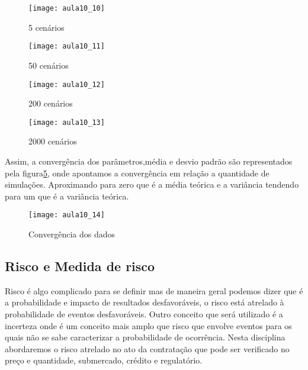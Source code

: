 \begin{figure}[H]
\begin{centering}
\texttt{[image: aula10\_10]}\protect\caption{\label{fig:aula10_10} 5 cenários}
\end{centering}
\end{figure}
\begin{figure}[H]
\begin{centering}
\texttt{[image: aula10\_11]}\protect\caption{\label{fig:aula10_11} 50 cenários}
\end{centering}
\end{figure}
\begin{figure}[H]
\begin{centering}
\texttt{[image: aula10\_12]}\protect\caption{\label{fig:aula10_12} 200 cenários}
\end{centering}
\end{figure}
\begin{figure}[H]
\begin{centering}
\texttt{[image: aula10\_13]}\protect\caption{\label{fig:aula10_13} 2000 cenários}
\end{centering}
\end{figure}

 Assim, a convergência dos parâmetros,média e desvio padrão são representados pela figura\ref{fig:aula10_14}, onde apontamos a convergência em relação a quantidade de simulações. Aproximando para zero que é a média teórica e a variância tendendo para um que é a variância teórica. 
\begin{figure}[H]
\begin{centering}
\texttt{[image: aula10\_14]}\protect\caption{\label{fig:aula10_14} Convergência dos dados}
\end{centering}
\end{figure}

\subsection{Risco e Medida de risco}
 Risco é algo complicado para se definir mas de maneira geral podemos dizer que é a probabilidade e impacto de resultados desfavoráveis, o risco está atrelado à probabilidade de eventos desfavoráveis. Outro conceito que será utilizado é a incerteza onde é um conceito mais amplo que risco que envolve eventos para os quais não se sabe caracterizar a probabilidade de ocorrência.
 Nesta disciplina abordaremos o risco atrelado no ato da contratação que pode ser verificado no preço e quantidade, submercado, crédito e regulatório.
  

